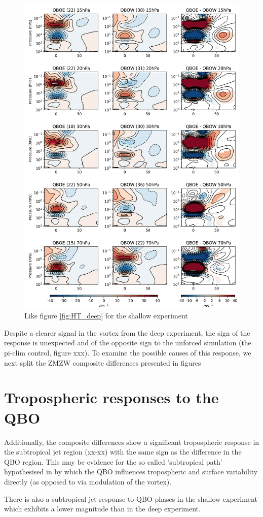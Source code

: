 \begin{figure}[h!]
\begin{center}
\noindent\includegraphics[width = 0.7\linewidth]{Figures/Figures-deepQBO/ZMZW_composites_QBO_phases_U_s_DJFMQBO_vs_DJFM_70hPa_5thresh.png}
\caption[Climatological seasonal cycle of equatorial ZMZW in QBO experiments]{Like figure \ref{fig:HT_deep} for the shallow experiment}
\label{fig:HT_shallow}
\end{center}
\end{figure}

Despite a clearer signal in the vortex from the deep experiment, the sign of the response is unexpected and of the opposite sign to the unforced simulation (the pi-clim control, figure xxx). To examine the possible causes of this response, we next split the ZMZW composite differences presented in figures  




\section{Tropospheric responses to the QBO}

Additionally, the composite differences show a significant tropospheric response in the subtropical jet region (xx-xx) with the same sign as the difference in the QBO region. This may be evidence for the so called 'subtropical path' hypothesised in \cite{graySurface2018} by which the QBO influences tropospheric and surface variability directly (as opposed to via modulation of the vortex).

There is also a subtropical jet response to QBO phases in the shallow experiment which exhibits a lower magnitude than in the deep experiment.






